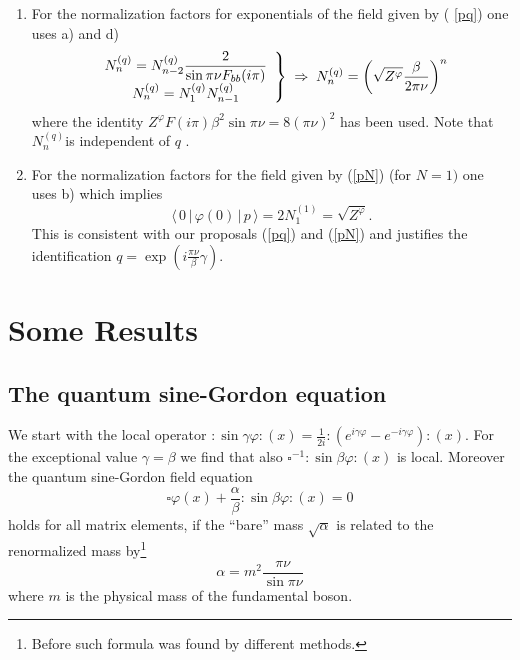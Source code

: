\documentclass[a4paper,12pt]{article}
\def\Box{\square}
\begin{document}
\begin{enumerate}
\item  For the normalization factors for exponentials of the field given by (%
\ref{pq}) one uses a) and d) \cite{BK1,BK2} 
\[
\left. 
\begin{array}{c}
N_{n}^{(q)}=N_{n-2}^{(q)}\dfrac{2}{\sin \pi \nu F_{bb}(i\pi )} \\ 
N_{n}^{(q)}=N_{1}^{(q)}N_{n-1}^{(q)}
\end{array}
\right\} \;\Rightarrow \;N_{n}^{(q)}=\left( \sqrt{Z^{\varphi }}\frac{\beta }{%
2\pi \nu }\right) ^{n} 
\]
where the identity $Z^{\varphi }F(i\pi )\beta ^{2}\sin \pi \nu =8\left( \pi
\nu \right) ^{2}$ has been used. Note that $N_{n}^{(q)}$is independent of $q$%
.

\item  For the normalization factors for the field given by (\ref{pN}) (for $%
N=1)$ one uses b) which implies 
\[
\langle \,0\,|\,\varphi (0)\,|\,p\,\rangle =2N_{1}^{(1)}=\sqrt{Z^{\varphi }}%
. 
\]
This is consistent with our proposals (\ref{pq}) and (\ref{pN}) and
justifies the identification $q=\exp \left( i\frac{\pi \nu }{\beta }\gamma
\right) $.
\end{enumerate}

\section{Some Results}

\subsection*{The quantum sine-Gordon equation}

We start with the local operator $:\!\sin \gamma \varphi \!:(x)=\frac{1}{2i}%
:\!\left( e^{i\gamma \varphi }-e^{-i\gamma \varphi }\right) \!:(x)$. For the
exceptional value $\gamma =\beta $ we find \cite{BK,BK2} that also $\Box
^{-1}\!:\!\sin \beta \varphi \!:(x)$ is local. Moreover the quantum
sine-Gordon field equation 
\begin{equation}
\Box \varphi (x)+\frac{\alpha }{\beta }:\!\sin \beta \varphi \!:(x)=0
\label{e}
\end{equation}
holds for all matrix elements, if the ``bare'' mass $\sqrt{\alpha }$ is
related to the renormalized mass by\footnote{%
Before such formula was found \cite{Fa,Za1} by different methods.} 
\begin{equation}
\alpha =m^{2}\frac{\pi \nu }{\sin \pi \nu }  \label{mass}
\end{equation}
where $m$ is the physical mass of the fundamental boson.
\end{document}
